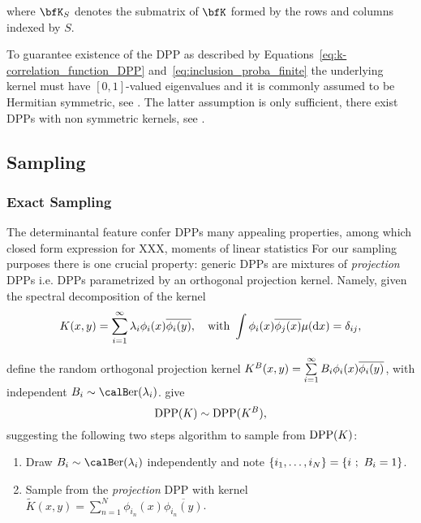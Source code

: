 \documentclass[twoside,11pt]{article}
\begin{document}
    where $\bfK_S$ denotes the submatrix of $\bfK$ formed by the rows and columns indexed by $S$.

    To guarantee existence of the DPP as described by Equations~\ref{eq:k-correlation_function_DPP} and~\ref{eq:inclusion_proba_finite} the underlying kernel must have $[0,1]$-valued eigenvalues and it is commonly assumed to be Hermitian symmetric, see \citep[Theorem 3]{Sos00}.
    The latter assumption is only sufficient, there exist DPPs with non symmetric kernels, see \citep{BoDiFu10}.

  \subsection{Sampling} %
  \label{sub:sampling}

    \subsubsection{Exact Sampling} %
    \label{ssub:exact_sampling}

      The determinantal feature confer DPPs many appealing properties, among which closed form expression for XXX, moments of linear statistics \etc
      For our sampling purposes there is one crucial property: generic DPPs are mixtures of \textit{projection} DPPs i.e. DPPs parametrized by an orthogonal projection kernel.
      Namely, given the spectral decomposition of the kernel
      \begin{equation}
      \label{eq:eigdec_kernel}
        K(x,y)=\sum\limits_{i=1}^{\infty} \lambda_i \phi_i(x) \overline{\phi_i(y)},
        \quad \text{with }
        \int \phi_i(x) \overline{\phi_j(x)} \mu(\mathop{}\!\mathrm{d} x) = \delta_{ij},
      \end{equation}

      define the random orthogonal projection kernel
      $
        K^B(x,y)
          = \sum\limits_{i=1}^{\infty} B_i \phi_i(x) \overline{\phi_i(y)}
      $, with independent $B_i\sim\Ber(\lambda_i)$.
      \citet[Theorem 7]{HKPV06} give
      \begin{equation}
        \operatorname{DPP}(K) \sim \operatorname{DPP}(K^B),
      \end{equation}
      suggesting the following two steps algorithm to sample from $\operatorname{DPP}(K)$:
      \begin{enumerate}
        \item Draw $B_i\sim\Ber(\lambda_i)$ independently and note $\left\{ i_1,\dots,i_{N} \right\} = \left\{ i~;~B_i=1 \right\}$.
        \item Sample from the \textit{projection} DPP with kernel $\tilde{K}(x,y) = \sum_{n=1}^{N}\phi_{i_n}(x) \overline{\phi_{i_n}(y)}$.
      \end{enumerate}
\end{document}

